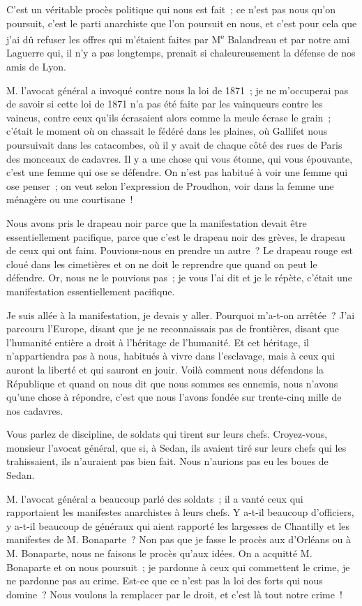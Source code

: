 \documentclass[french,twoside]{book} %
\begin{document}
\noindent C’est un véritable procès politique qui nous est fait ; ce n’est pas nous qu’on poursuit, c’est le parti anarchiste que l’on poursuit en nous, et c’est pour cela que j’ai dû refuser les offres qui m’étaient faites par M\textsuperscript{e} Balandreau et par notre ami Laguerre qui, il n’y a pas longtemps, prenait si chaleureusement la défense de nos amis de Lyon.\par
M. l’avocat général a invoqué contre nous la loi de 1871 ; je ne m’occuperai pas de savoir si cette loi de 1871 n’a pas été faite par les vainqueurs contre les vaincus, contre ceux qu’ils écrasaient alors comme la meule écrase le grain ; c’était le moment où on chassait le fédéré dans les plaines, où Gallifet nous poursuivait dans les catacombes, où il y avait de chaque côté des rues de Paris des monceaux de cadavres. Il y a une chose qui vous étonne, qui vous épouvante, c’est une femme qui ose se défendre. On n’est pas habitué à voir une femme qui ose penser ; on veut selon l’expression de Proudhon, voir dans la femme une ménagère ou une courtisane !\par
Nous avons pris le drapeau noir parce que la manifestation devait être essentiellement pacifique, parce que c’est le drapeau noir des grèves, le drapeau de ceux qui ont faim. Pouvions-nous en prendre un autre ? Le drapeau rouge est cloué dans les cimetières et on ne doit le reprendre que quand on peut le défendre. Or, nous ne le pouvions pas ; je vous l’ai dit et je le répète, c’était une manifestation essentiellement pacifique.\par
Je suis allée à la manifestation, je devais y aller. Pourquoi m’a-t-on arrêtée ? J’ai parcouru l’Europe, disant que je ne reconnaissais pas de frontières, disant que l’humanité entière a droit à l’héritage de l’humanité. Et cet héritage, il n’appartiendra pas à nous, habitués à vivre dans l’esclavage, mais à ceux qui auront la liberté et qui sauront en jouir. Voilà comment nous défendons la République et quand on nous dit que nous sommes ses ennemis, nous n’avons qu’une chose à répondre, c’est que nous l’avons fondée sur trente-cinq mille de nos cadavres.\par
 Vous parlez de discipline, de soldats qui tirent sur leurs chefs. Croyez-vous, monsieur l’avocat général, que si, à Sedan, ils avaient tiré sur leurs chefs qui les trahissaient, ils n’auraient pas bien fait. Nous n’aurions pas eu les boues de Sedan.\par
M. l’avocat général a beaucoup parlé des soldats ; il a vanté ceux qui rapportaient les manifestes anarchistes à leurs chefs. Y a-t-il beaucoup d’officiers, y a-t-il beaucoup de généraux qui aient rapporté les largesses de Chantilly et les manifestes de M. Bonaparte ? Non pas que je fasse le procès aux d’Orléans ou à M. Bonaparte, nous ne faisons le procès qu’aux idées. On a acquitté M. Bonaparte et on nous poursuit ; je pardonne à ceux qui commettent le crime, je ne pardonne pas au crime. Est-ce que ce n’est pas la loi des forts qui nous domine ? Nous voulons la remplacer par le droit, et c’est là tout notre crime !\par
\end{document}
